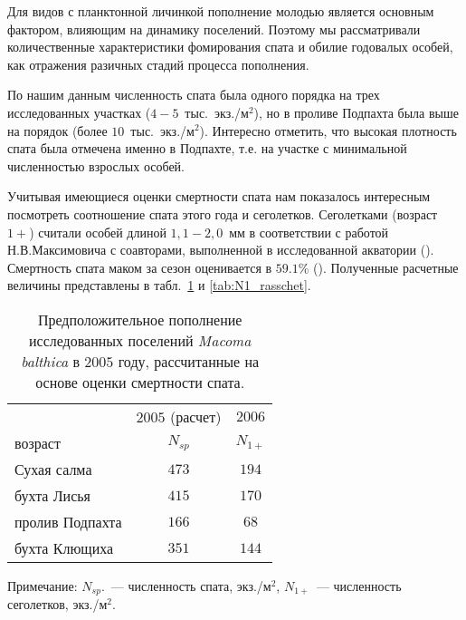 Для видов с планктонной личинкой пополнение молодью является основным фактором, влияющим на динамику поселений.
Поэтому мы рассматривали количественные характеристики фомирования спата и обилие годовалых особей, как отражения разичных стадий процесса пополнения.

По нашим данным численность спата была одного порядка на трех исследованных участках ($4-5$~тыс.~экз./м$^2$), но в проливе Подпахта была выше на порядок (более $10$~тыс.~экз./м$^2$). 
Интересно отметить, что высокая плотность спата была отмечена именно в Подпахте, т.е. на участке с минимальной численностью взрослых особей. 

Учитывая имеющиеся оценки смертности спата нам показалось интересным посмотреть соотношение спата этого года и сеголетков. 
Сеголетками (возраст $1+$) считали особей длиной $1,1-2,0$~мм в соответствии с работой Н.В.Максимовича с соавторами, выполненной в исследованной акватории (\cite{Maximovich_et_al_1992}). 
Смертность спата маком за сезон оценивается в $59.1$\% (\cite{Burkovskiy_et_al_1998}). Полученные расчетные величины представлены в табл.~\ref{tab:spat_rasschet} и \ref{tab:N1_rasschet}.

\begin{table}[p]
\caption{Предположительное пополнение исследованных поселений \textit{Macoma balthica} в $2005$ году, рассчитанные на основе оценки смертности спата.}
\label{tab:spat_rasschet}
\begin{center}
\begin{tabular}{|l|c|c|}
\hline
                & $2005$ (расчет) & $2006$ \\ 
возраст         & $N_{sp}$      & $N_{1+}$  \\ \hline
Сухая салма     & $473$           & $194$  \\ \hline
бухта Лисья     & $415$           & $170$  \\ \hline
пролив Подпахта & $166$           & $68$   \\ \hline
бухта Клющиха   & $351$           & $144$  \\ \hline
\end{tabular}
\end{center}
	\footnotesize{Примечание: $N_{sp}$.~--- численность спата, экз./м$^2$, $N_{1+}$~--- численность сеголетков, экз./м$^2$.}

\end{table}


